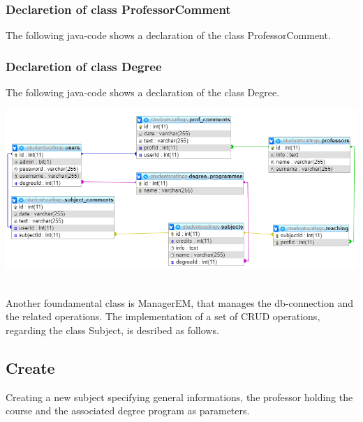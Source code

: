 \documentclass[a4paper, oneside]{article}
\begin{document}
\subsubsection{Declaretion of class ProfessorComment}
The following java-code shows a declaration of the class ProfessorComment.
\vspace{2mm}

\vspace{5mm}


\subsubsection{Declaretion of class Degree}
The following java-code shows a declaration of the class Degree.
\vspace{2mm}

\vspace{5mm}

\begin{minipage}{\linewidth}
\begin{center}
\vspace{1mm}
\includegraphics[width=155mm]{./images/diagrams/er_diagram2.png} 
\label{fig:diagramma_er2}
\end{center}
\end{minipage}
\vspace{5mm}\\
 Another foundamental class is ManagerEM, that manages the db-connection and the related operations.
 The implementation of a set of CRUD operations, regarding the class Subject, is desribed as follows.

\subsection{Create}
Creating a new subject specifying general informations, the professor holding the course and the associated degree program as parameters.\\
\vspace{2mm}

\vspace{5mm}
\end{document}
